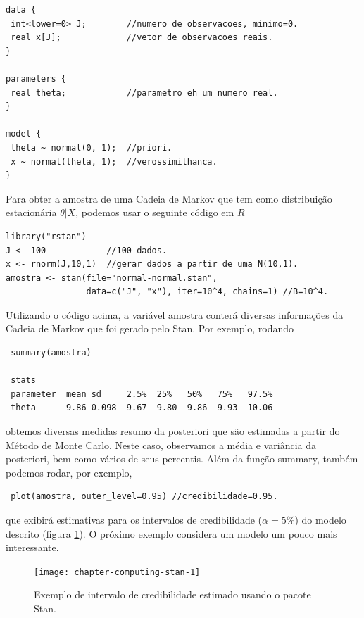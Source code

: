 \begin{verbatim}
data {
 int<lower=0> J;        //numero de observacoes, minimo=0.
 real x[J];             //vetor de observacoes reais.
}

parameters {
 real theta;            //parametro eh um numero real.
}

model {
 theta ~ normal(0, 1);  //priori.
 x ~ normal(theta, 1);  //verossimilhanca.
}
\end{verbatim}

Para obter a amostra de uma Cadeia de Markov
que tem como distribuição estacionária $\theta|X$,
podemos usar o seguinte código em $R$

\begin{verbatim}
library("rstan")
J <- 100            //100 dados.
x <- rnorm(J,10,1)  //gerar dados a partir de uma N(10,1).
amostra <- stan(file="normal-normal.stan", 
                data=c("J", "x"), iter=10^4, chains=1) //B=10^4.
\end{verbatim}

Utilizando o código acima, 
a variável amostra conterá diversas informações
da Cadeia de Markov que foi gerado pelo Stan.
Por exemplo, rodando
\begin{verbatim}
 summary(amostra)
 
 stats
 parameter  mean sd     2.5%  25%   50%   75%   97.5%
 theta      9.86 0.098  9.67  9.80  9.86  9.93  10.06
\end{verbatim}
obtemos diversas medidas resumo da posteriori
que são estimadas a partir do Método de Monte Carlo.
Neste caso, observamos a média e variância da posteriori,
bem como vários de seus percentis.
Além da função summary, também podemos rodar, por exemplo,
\begin{verbatim}
 plot(amostra, outer_level=0.95) //credibilidade=0.95.
\end{verbatim}
que exibirá estimativas para os intervalos de credibilidade ($\alpha=5\%$)
do modelo descrito (figura \ref{fig:stan-1}).
O próximo exemplo considera um modelo um pouco mais interessante. 
\begin{figure}
 \centering
 \texttt{[image: chapter-computing-stan-1]}
 \caption{Exemplo de intervalo de credibilidade estimado usando
          o pacote Stan.}
 \label{fig:stan-1}
\end{figure}

